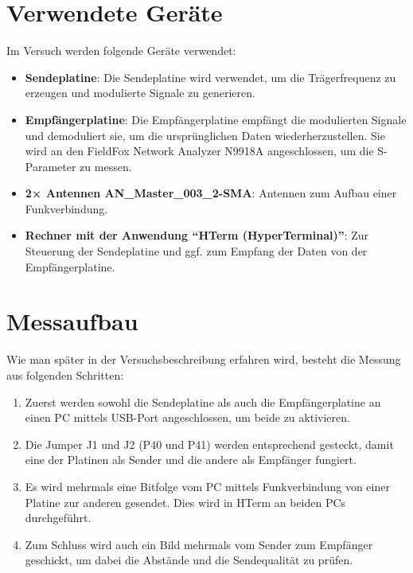 \section{Verwendete Geräte}
Im Versuch werden folgende Geräte verwendet:
\begin{itemize}
    \item \textbf{Sendeplatine}: Die Sendeplatine wird verwendet, um die Trägerfrequenz zu erzeugen und modulierte Signale zu generieren.
    \item \textbf{Empfängerplatine}: Die Empfängerplatine empfängt die modulierten Signale und demoduliert sie, um die ursprünglichen Daten wiederherzustellen. Sie wird an den FieldFox Network Analyzer N9918A angeschlossen, um die S-Parameter zu messen.
    \item \textbf{2× Antennen AN\_Master\_003\_2-SMA}: Antennen zum Aufbau einer Funkverbindung.
    \item \textbf{Rechner mit der Anwendung "`HTerm (HyperTerminal)"'}: Zur Steuerung der Sendeplatine und ggf. zum Empfang der Daten von der Empfängerplatine.
\end{itemize}
\section{Messaufbau}
Wie man später in der Versuchsbeschreibung erfahren wird, besteht die Messung aus folgenden Schritten:
\begin{enumerate}
    \item Zuerst werden sowohl die Sendeplatine als auch die Empfängerplatine an einen PC mittels USB-Port angeschlossen, um beide zu aktivieren.
    \item Die Jumper J1 und J2 (P40 und P41) werden entsprechend gesteckt, damit eine der Platinen als Sender und die andere als Empfänger fungiert.
    \item Es wird mehrmals eine Bitfolge vom PC mittels Funkverbindung von einer Platine zur anderen gesendet. Dies wird in HTerm an beiden PCs durchgeführt.
    \item Zum Schluss wird auch ein Bild mehrmals vom Sender zum Empfänger geschickt, um dabei die Abstände und die Sendequalität zu prüfen.
\end{enumerate}
\clearpage